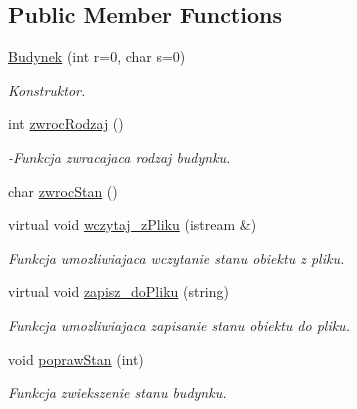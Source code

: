 \subsection*{Public Member Functions}
\begin{DoxyCompactItemize}
\item 
\hyperlink{class_budynek_a6130ff6245a4f097247c7f6ab68d14e2}{Budynek} (int r=0, char s=0)
\begin{DoxyCompactList}\small\item\em Konstruktor. \end{DoxyCompactList}\item 
\hypertarget{class_budynek_a6f682a6b4f44890413a20b87188dbcec}{}int \hyperlink{class_budynek_a6f682a6b4f44890413a20b87188dbcec}{zwroc\+Rodzaj} ()\label{class_budynek_a6f682a6b4f44890413a20b87188dbcec}

\begin{DoxyCompactList}\small\item\em -\/\+Funkcja zwracajaca rodzaj budynku. \end{DoxyCompactList}\item 
char \hyperlink{class_budynek_abba0db0edd3d93f17cb5132c60bbfaa2}{zwroc\+Stan} ()
\item 
\hypertarget{class_budynek_af5e0277c39c21e787f695ab93ed595e4}{}virtual void \hyperlink{class_budynek_af5e0277c39c21e787f695ab93ed595e4}{wczytaj\+\_\+z\+Pliku} (istream \&)\label{class_budynek_af5e0277c39c21e787f695ab93ed595e4}

\begin{DoxyCompactList}\small\item\em Funkcja umozliwiajaca wczytanie stanu obiektu z pliku. \end{DoxyCompactList}\item 
\hypertarget{class_budynek_a583785190d93363081f9c6c62d43cbdb}{}virtual void \hyperlink{class_budynek_a583785190d93363081f9c6c62d43cbdb}{zapisz\+\_\+do\+Pliku} (string)\label{class_budynek_a583785190d93363081f9c6c62d43cbdb}

\begin{DoxyCompactList}\small\item\em Funkcja umozliwiajaca zapisanie stanu obiektu do pliku. \end{DoxyCompactList}\item 
\hypertarget{class_budynek_abe365ed665adfe618be92e6767e628f3}{}void \hyperlink{class_budynek_abe365ed665adfe618be92e6767e628f3}{popraw\+Stan} (int)\label{class_budynek_abe365ed665adfe618be92e6767e628f3}

\begin{DoxyCompactList}\small\item\em Funkcja zwiekszenie stanu budynku. \end{DoxyCompactList}\end{DoxyCompactItemize}
